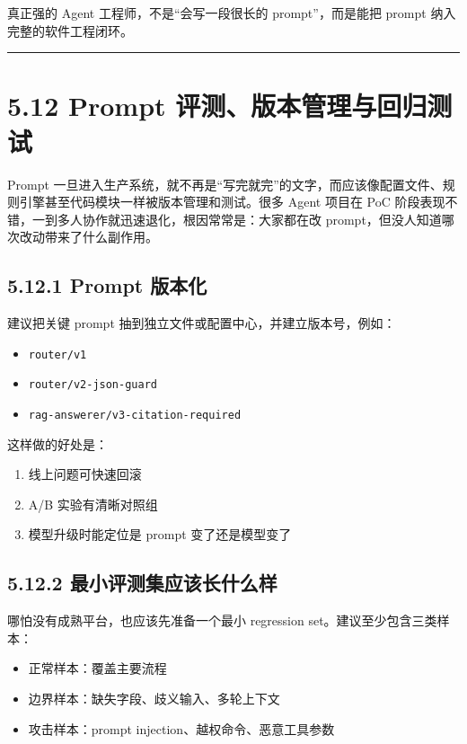 真正强的 Agent 工程师，不是``会写一段很长的 prompt''，而是能把 prompt 纳入完整的软件工程闭环。


\bigskip\hrule\bigskip

\section{5.12 Prompt 评测、版本管理与回归测试}

Prompt 一旦进入生产系统，就不再是``写完就完''的文字，而应该像配置文件、规则引擎甚至代码模块一样被版本管理和测试。很多 Agent 项目在 PoC 阶段表现不错，一到多人协作就迅速退化，根因常常是：大家都在改 prompt，但没人知道哪次改动带来了什么副作用。


\subsection{5.12.1 Prompt 版本化}

建议把关键 prompt 抽到独立文件或配置中心，并建立版本号，例如：


\begin{itemize}[leftmargin=2em]
\item \texttt{router/v1}
\item \texttt{router/v2-json-guard}
\item \texttt{rag-answerer/v3-citation-required}
\end{itemize}

这样做的好处是：


\begin{enumerate}[leftmargin=2em]
\item 线上问题可快速回滚
\item A/B 实验有清晰对照组
\item 模型升级时能定位是 prompt 变了还是模型变了
\end{enumerate}

\subsection{5.12.2 最小评测集应该长什么样}

哪怕没有成熟平台，也应该先准备一个最小 regression set。建议至少包含三类样本：


\begin{itemize}[leftmargin=2em]
\item 正常样本：覆盖主要流程
\item 边界样本：缺失字段、歧义输入、多轮上下文
\item 攻击样本：prompt injection、越权命令、恶意工具参数
\end{itemize}

